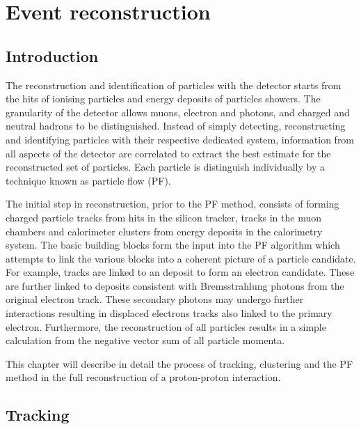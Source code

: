 \chapter{Event reconstruction}\label{chap:reconstruction}


\section{Introduction}

The reconstruction and identification of particles with the \CMS detector starts from the hits of ionising particles and energy deposits of particles showers. The granularity of the \CMS detector allows muons, electron and photons, and charged and neutral hadrons to be distinguished. Instead of simply detecting, reconstructing and identifying particles with their respective dedicated system, information from all aspects of the detector are correlated to extract the best estimate for the reconstructed set of particles. Each particle is distinguish individually by a technique known as particle flow (PF).

The initial step in reconstruction, prior to the PF method, consists of
forming charged particle tracks from hits in the silicon tracker, tracks in
the muon chambers and calorimeter clusters from energy deposits in the
calorimetry system. The basic building blocks form the input into the PF
algorithm which attempts to link the various blocks into a coherent picture of
a particle candidate. For example, tracks are linked to an \ECAL deposit to
form an electron candidate. These are further linked to \ECAL deposits consistent
with Bremsstrahlung photons from the original electron track. These secondary photons may undergo further interactions resulting in displaced electrons tracks also linked to the primary electron. Furthermore, the reconstruction of all particles results in a simple \ptmiss calculation from the negative vector sum of all particle momenta.

This chapter will describe in detail the process of tracking, clustering and
the PF method in the full reconstruction of a proton-proton interaction.


\section{Tracking}

